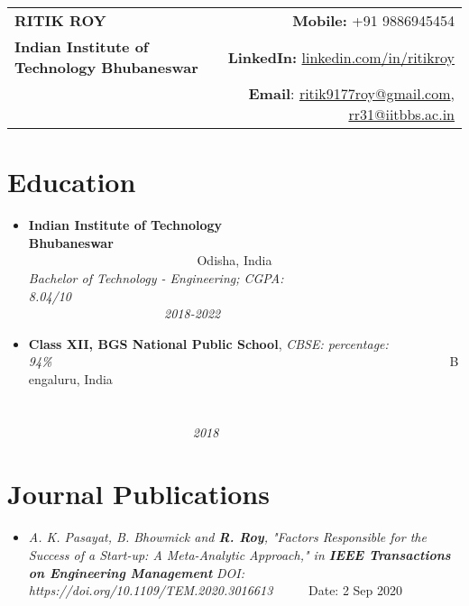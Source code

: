 \documentclass[a4paper,20pt]{article}
\newcommand{\resumeItem}[2]{
  \item\small{
    {#1}{#2 \vspace{-2pt}}
  }
}
\newcommand{\resumeSubItem}[2]{\resumeItem{#1}{#2}\vspace{-2pt}}
\newcommand{\resumeSubHeadingListStart}{\begin{itemize}[leftmargin=*]}
\newcommand{\resumeSubHeadingListEnd}{\end{itemize}}
\begin{document}
\begin{tabular*}{\textwidth}{l@{\extracolsep{\fill}}r}
  \textbf{{\LARGE RITIK ROY}} & \textbf{Mobile:} {+91 9886945454}\\
  {\textbf{\large Indian Institute of Technology Bhubaneswar}} & \textbf{LinkedIn:} \href{https://www.linkedin.com/in/ritikroy/}{linkedin.com/in/ritikroy}\\ &
  {\textbf{Email}: \href{mailto:ritik9177roy@gmailcom}{ritik9177roy@gmail.com}, \href{mailto:rr31@iitbbs.ac.in}{rr31@iitbbs.ac.in}} 
\end{tabular*}
\vspace{-12pt}
\section{Education}
\begin{itemize}[leftmargin=*]
\item {\textbf{Indian Institute of Technology Bhubaneswar}~~~~~~~~~~~~~~~~~~~~~~~~~~~~~~~~~~~~~~~~~~~~~~~~~~~~~~~~~~~~~~~~~~~~~~~~~~~~~~~~~ Odisha, India\\\emph{Bachelor of Technology - Engineering; CGPA: 8.04/10~~~~~~~~~~~~~~~~~~~~~~~~~~~~~~~~~~~~~~~~~~~~~~~~~~~~~~~~~~~~~~~~~~~~~~~~~~~~~~~~~2018-2022}}
\vspace{-5.5pt}
\item {\textbf{Class XII, BGS National Public School}, \small{\emph{CBSE: percentage: 94\%}}~~~~~~~~~~~~~~~~~~~~~~~~~~~~~~~~~~~~~~~~~~~~~~~~~~~~~~~~~~~~~~~\normalsize{Bengaluru, India} \\~~~~~~~~~~~~~~~~~~~~~~~~~~~~~~~~~~~~~~~~~~~~~~~~~~~~~~~~~~~~~~~~~~~~~~~~~~~~~~~~~~~~~~~~~~~~~~~~~~~~~~~~~~~~~~~~~~~~~~~~~~~~~~~~~~~~~~~~~~~~~~~~~~~~~~~~~~~~~~~~~~\emph{2018}}
\end{itemize}
\vspace{-23pt}  
\section{Journal Publications}
\resumeSubHeadingListStart
\resumeSubItem{\emph{A. K. Pasayat, B. Bhowmick and \textbf{R. Roy}, "Factors Responsible for the Success of a Start-up: A Meta-Analytic Approach," in \textbf{IEEE Transactions on Engineering Management}}}{ \color{ceruleanblue}\emph{DOI: https://doi.org/10.1109/TEM.2020.3016613} \footnotesize{\color{black}~~~~~Date: 2 Sep 2020}}
\vspace{-1pt}
\resumeSubHeadingListEnd
\end{document}
